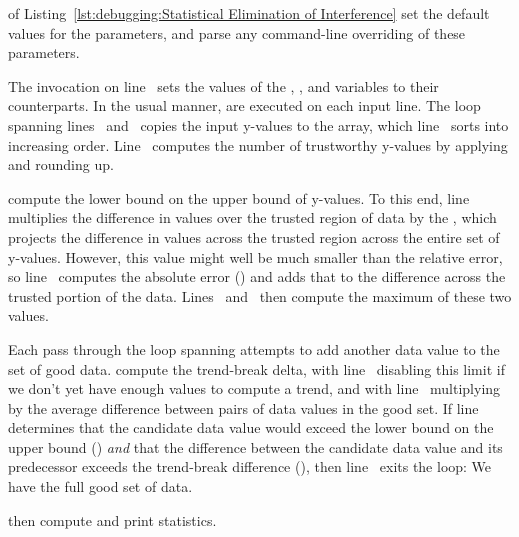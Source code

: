 \begin{lineref}
 of
Listing~\ref{lst:debugging:Statistical Elimination of Interference}
set the default values for the parameters, and
 parse
any command-line overriding of these parameters.
\end{lineref}
\begin{lineref}
The  invocation on line~ sets the values of the
, , and  variables to their
 counterparts.
In the usual  manner,
 are executed on each input
line.
The loop spanning lines~ and~ copies
the input y-values to the
 array, which line~ sorts into increasing order.
Line~ computes the number of trustworthy y-values
by applying  and rounding up.

 compute the 
lower bound on the upper bound of y-values.
To this end, line~ multiplies the difference in values over
the trusted region of data by the , which projects the
difference in values across the trusted region across the entire
set of y-values.
However, this value might well be much smaller than the relative error,
so line~ computes the absolute error ()
and adds
that to the difference  across the trusted portion of the data.
Lines~ and~ then compute the maximum of
these two values.

Each pass through the loop spanning 
attempts to add another
data value to the set of good data.
 compute the trend-break delta,
with line~ disabling this
limit if we don't yet have enough values to compute a trend,
and with line~ multiplying  by the average
difference between pairs of data values in the good set.
If line~ determines that the candidate data value would exceed the
lower bound on the upper bound () \emph{and}
that the difference between the candidate data value
and its predecessor exceeds the trend-break difference (),
then line~ exits the loop: We have the full good set of data.

 then compute and print
statistics.
\end{lineref}


